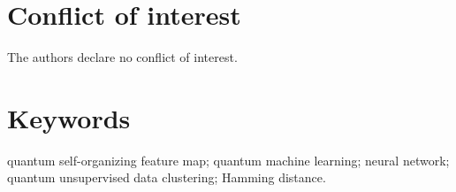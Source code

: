 \documentclass[pra,showkeys,twocolumn,showpacs]{revtex4-1}
\begin{document}
\section*{Conflict of interest}

The authors declare no conflict of interest.


\section*{Keywords}
quantum self-organizing feature map; 
quantum machine learning; 
neural network; 
quantum unsupervised data clustering; 
Hamming distance.




\end{document}
